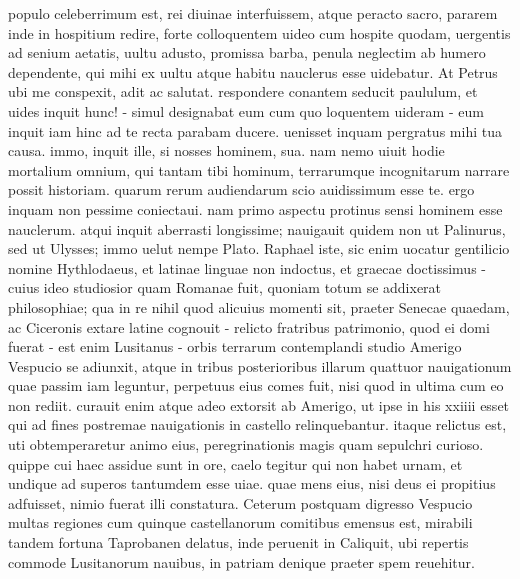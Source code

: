 \documentclass[12pt,a4paper]{book}
\begin{document}
\begin{pairs}
\begin{Rightside}
populo celeberrimum est, rei diuinae interfuissem, atque peracto sacro, pararem 
inde in hospitium redire, forte colloquentem uideo cum hospite quodam, uergentis 
ad senium aetatis, uultu adusto, promissa barba, penula neglectim ab humero 
dependente, qui mihi ex uultu atque habitu nauclerus esse uidebatur. 
At Petrus ubi me conspexit, adit ac salutat. respondere conantem seducit 
paululum, et uides inquit hunc! - simul designabat eum cum quo loquentem uideram 
- eum inquit iam hinc ad te recta parabam ducere. uenisset inquam pergratus mihi 
tua causa. immo, inquit ille, si nosses hominem, sua. nam nemo uiuit hodie 
mortalium omnium, qui tantam tibi hominum, terrarumque incognitarum narrare 
possit historiam. quarum rerum audiendarum scio auidissimum esse te. ergo inquam 
non pessime coniectaui. nam primo aspectu protinus sensi hominem esse nauclerum. 
atqui inquit aberrasti longissime; nauigauit quidem non ut Palinurus, sed ut 
Ulysses; immo uelut nempe Plato. 
\pend
\pstart
Raphael iste, sic enim uocatur gentilicio 
nomine Hythlodaeus, et latinae linguae non indoctus, et graecae doctissimus - 
cuius ideo studiosior quam Romanae fuit, quoniam totum se addixerat 
philosophiae; qua in re nihil quod alicuius momenti sit, praeter Senecae 
quaedam, ac Ciceronis extare latine cognouit - relicto fratribus patrimonio, 
quod ei domi fuerat - est enim Lusitanus - orbis terrarum contemplandi studio 
Amerigo Vespucio se adiunxit, atque in tribus posterioribus illarum quattuor 
nauigationum quae passim iam leguntur, perpetuus eius comes fuit, nisi quod in 
ultima cum eo non rediit. curauit enim atque adeo extorsit ab Amerigo, ut ipse 
in his xxiiii esset qui ad fines postremae nauigationis in castello 
relinquebantur. itaque relictus est, uti obtemperaretur animo eius, 
peregrinationis magis quam sepulchri curioso. quippe cui haec assidue sunt in 
ore, caelo tegitur qui non habet urnam, et undique ad superos tantumdem esse 
uiae. quae mens eius, nisi deus ei propitius adfuisset, nimio fuerat illi 
constatura. 
\pend
\pstart
Ceterum postquam digresso Vespucio multas regiones cum quinque castellanorum 
comitibus emensus est, mirabili tandem fortuna Taprobanen delatus, inde peruenit 
in Caliquit, ubi repertis commode Lusitanorum nauibus, in patriam denique 
praeter spem reuehitur. 
\pend
	\endnumbering
    \end{Rightside}
 \end{pairs}
 \Columns
\end{document}
